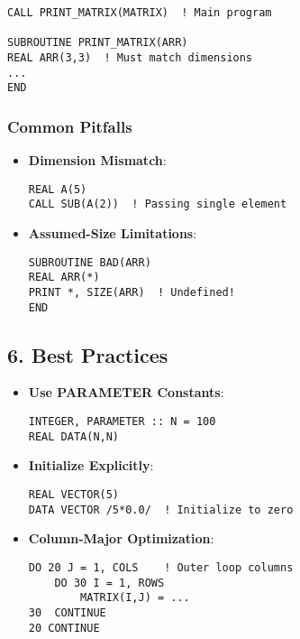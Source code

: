\documentclass{book}
\begin{document}
\begin{verbatim}
CALL PRINT_MATRIX(MATRIX)  ! Main program

SUBROUTINE PRINT_MATRIX(ARR)
REAL ARR(3,3)  ! Must match dimensions
...
END
\end{verbatim}

\subsubsection*{Common Pitfalls}
\begin{itemize}
\item \textbf{Dimension Mismatch}: 
\begin{verbatim}
REAL A(5)
CALL SUB(A(2))  ! Passing single element
\end{verbatim}

\item \textbf{Assumed-Size Limitations}:
\begin{verbatim}
SUBROUTINE BAD(ARR)
REAL ARR(*)  
PRINT *, SIZE(ARR)  ! Undefined!
END
\end{verbatim}
\end{itemize}

\subsection*{6. Best Practices}
\begin{itemize}
\item \textbf{Use PARAMETER Constants}:
\begin{verbatim}
INTEGER, PARAMETER :: N = 100
REAL DATA(N,N)
\end{verbatim}

\item \textbf{Initialize Explicitly}:
\begin{verbatim}
REAL VECTOR(5)
DATA VECTOR /5*0.0/  ! Initialize to zero
\end{verbatim}

\item \textbf{Column-Major Optimization}:
\begin{verbatim}
DO 20 J = 1, COLS    ! Outer loop columns
    DO 30 I = 1, ROWS
        MATRIX(I,J) = ...
30  CONTINUE
20 CONTINUE
\end{verbatim}
\end{itemize}
\end{document}
